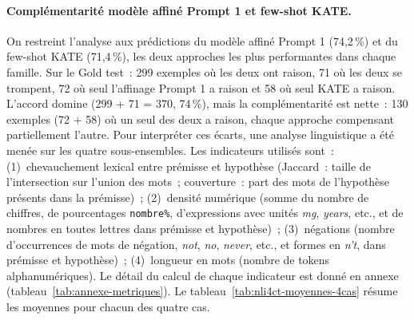 \documentclass[10pt,twoside]{article}
\begin{document}
\paragraph{Complémentarité modèle affiné Prompt 1 et few-shot KATE.}
On restreint l'analyse aux prédictions du modèle affiné Prompt 1 (74,2\,\%) et du few-shot KATE (71,4\,\%), les deux approches les plus performantes dans chaque famille. Sur le Gold test~: 299 exemples où les deux ont raison, 71 où les deux se trompent, 72 où seul l'affinage Prompt 1 a raison et 58 où seul KATE a raison. L'accord domine (299 + 71 = 370, 74\,\%), mais la complémentarité est nette~: 130 exemples (72 + 58) où un seul des deux a raison, chaque approche compensant partiellement l'autre. Pour interpréter ces écarts, une analyse linguistique a été menée sur les quatre sous-ensembles. Les indicateurs utilisés sont~: (1)~chevauchement lexical entre prémisse et hypothèse (Jaccard~: taille de l'intersection sur l'union des mots~; couverture~: part des mots de l'hypothèse présents dans la prémisse)~; (2)~densité numérique (somme du nombre de chiffres, de pourcentages \texttt{nombre\%}, d'expressions avec unités \textit{mg}, \textit{years}, etc., et de nombres en toutes lettres dans prémisse et hypothèse)~; (3)~négations (nombre d'occurrences de mots de négation, \textit{not}, \textit{no}, \textit{never}, etc., et formes en \textit{n't}, dans prémisse et hypothèse)~; (4)~longueur en mots (nombre de tokens alphanumériques). Le détail du calcul de chaque indicateur est donné en annexe (tableau~\ref{tab:annexe-metriques}). Le tableau~\ref{tab:nli4ct-moyennes-4cas} résume les moyennes pour chacun des quatre cas.

\begin{table}[htbp]
\centering
\caption{Moyennes des indicateurs linguistiques par cas (modèle affiné Prompt 1 vs few-shot KATE).}
\label{tab:nli4ct-moyennes-4cas}
\scriptsize
{}
\end{table}
\end{document}
